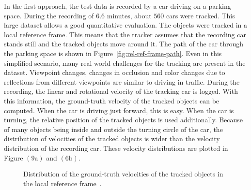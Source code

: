 \documentclass[twoside,a4paper,article]{combine}
\begin{document}
In the first approach, the test data is recorded by a car driving on a
parking space. During the recording of $6.6$ minutes, about $560$ cars
were tracked. This large dataset allows a good quantitative
evaluation. The objects were tracked in a local reference frame. This
means that the tracker assumes that the recording car stands still and
the tracked objects move around it. The path of the car through the
parking space is shown in Figure~\ref{fig:rel-ref-frame-path}. Even in
this simplified scenario, many real world challenges for the tracking
are present in the dataset. Viewpoint changes, changes in occlusion
and color changes due to reflections from different viewpoints are
similar to driving in traffic. During the recording, the linear and
rotational velocity of the tracking car is logged. With this
information, the ground-truth velocity of the tracked objects can be
computed. When the car is driving just forward, this is easy. When the car
is turning, the relative position of the tracked objects is used
additionally. Because of many objects being inside and outside the
turning circle of the car, the distribution of velocities of the
tracked objects is wider than the velocity distribution of the recording
car. These velocity distributions are plotted in
Figure $(9\mbox{a})$ and $(6\mbox{b})$.
\begin{figure}
  \center
  \caption{Distribution of the ground-truth velocities of the tracked
    objects in the local reference frame~\cite{paper}.}
  \label{fig:rel-ref-frame}
\end{figure}
\end{document}
